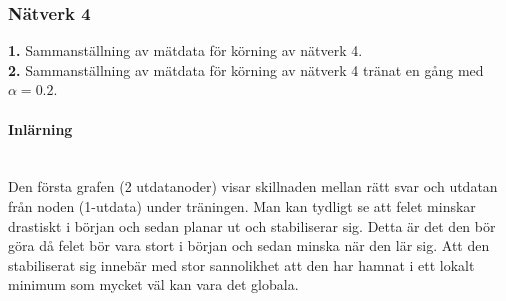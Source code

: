 \documentclass[a4paper,10pt]{article}
\begin{document}
\subsubsection{Nätverk 4}
{\bf 1.} Sammanställning av mätdata för körning av nätverk 4.\\
{\bf 2.} Sammanställning av mätdata för körning av nätverk 4 tränat en gång med $\alpha=0.2$.\\
\begin{center}
\end{center}

\paragraph{Inlärning}\hspace{0pt}\\
Den första grafen (2 utdatanoder) visar skillnaden mellan rätt svar och utdatan från noden (1-utdata) under träningen. Man kan tydligt se att felet minskar drastiskt i början och sedan planar ut och stabiliserar sig. Detta är det den bör göra då felet bör vara stort i början och sedan minska när den lär sig. Att den stabiliserat sig innebär med stor sannolikhet att den har hamnat i ett lokalt minimum som mycket väl kan vara det globala. 
\end{document}
